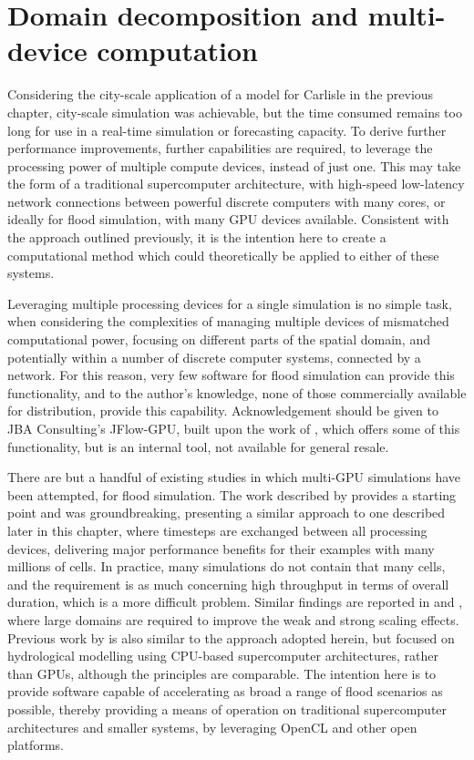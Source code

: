 \chapter{Domain decomposition and multi-device computation}
\label{chapter:Decomposition}

Considering the city-scale application of a model for Carlisle in the previous chapter, city-scale simulation was achievable, but the time consumed remains too long for use in a real-time simulation or forecasting capacity. To derive further performance improvements, further capabilities are required, to leverage the processing power of multiple compute devices, instead of just one. This may take the form of a traditional supercomputer architecture, with high-speed low-latency network connections between powerful discrete computers with many cores, or ideally for flood simulation, with many GPU devices available. Consistent with the approach outlined previously, it is the intention here to create a computational method which could theoretically be applied to either of these systems.

Leveraging multiple processing devices for a single simulation is no simple task, when considering the complexities of managing multiple devices of mismatched computational power, focusing on different parts of the spatial domain, and potentially within a number of discrete computer systems, connected by a network. For this reason, very few software for flood simulation can provide this functionality, and to the author's knowledge, none of those commercially available for distribution, provide this capability. Acknowledgement should be given to JBA Consulting's JFlow-GPU, built upon the work of \citet{Crossley2009}, which offers some of this functionality, but is an internal tool, not available for general resale.

There are but a handful of existing studies in which multi-GPU simulations have been attempted, for flood simulation. The work described by \citet{Saetra2012} provides a starting point and was groundbreaking, presenting a similar approach to one described later in this chapter, where timesteps are exchanged between all processing devices, delivering major performance benefits for their examples with many millions of cells. In practice, many simulations do not contain that many cells, and the requirement is as much concerning high throughput in terms of overall duration, which is a more difficult problem. Similar findings are reported in \citet{Vinas2013} and \citet{Asuncion2016}, where large domains are required to improve the weak and strong scaling effects. Previous work by \citet{Sanders2010} is also similar to the approach adopted herein, but focused on hydrological modelling using CPU-based supercomputer architectures, rather than GPUs, although the principles are comparable. The intention here is to provide software capable of accelerating as broad a range of flood scenarios as possible, thereby providing a means of operation on traditional supercomputer architectures and smaller systems, by leveraging OpenCL and other open platforms.

